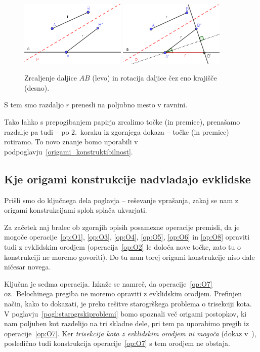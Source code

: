\begin{dokaz}
    \begin{figure}[h]
        \centering
        \includegraphics[width=0.45\textwidth]{images/zrcaljenje_korak1.png}
        \includegraphics[width=0.45\textwidth]{images/zrcaljenje_korak2.png}
        \caption[Prenašanje razdalj z origamijem po korakih]{Zrcaljenje daljice $AB$ (levo) in rotacija daljice čez eno krajišče (desno).}
        \label{fig:prenos_razdalje_koraki}
    \end{figure}

    S tem smo razdaljo $r$ prenesli na poljubno mesto v ravnini.
\end{dokaz}

Tako lahko s prepogibanjem papirja zrcalimo točke (in premice), prenašamo razdalje pa tudi -- po 2.\ koraku iz zgornjega dokaza -- točke (in premice) rotiramo. To novo znanje bomo uporabili v podpoglavju~\ref{origami_konstruktibilnost}.

\subsection{Kje origami konstrukcije nadvladajo evklidske}

Prišli smo do ključnega dela poglavja -- reševanje vprašanja, zakaj se nam z origami konstrukcijami sploh splača ukvarjati.

Za začetek naj bralec ob zgornjih opisih posamezne operacije premisli, da je mogoče operacije~\ref{op:O1}, \ref{op:O3}, \ref{op:O4}, \ref{op:O5}, \ref{op:O6} in \ref{op:O8} opraviti tudi z evklidskim orodjem (operacija~\ref{op:O2} le določa nove točke, zato tu o konstrukciji ne moremo govoriti). Do tu nam torej origami konstrukcije niso dale ničesar novega.

Ključna je sedma operacija. Izkaže se namreč, da operacije~\ref{op:O7} oz.\ Belochinega pregiba ne moremo opraviti z evklidskim orodjem. Prefinjen način, kako to dokazati, je preko rešitve starogrškega problema o trisekciji kota. V poglavju~\ref{pogl:starogrskiproblemi} bomo spoznali več origami postopkov, ki nam poljuben kot razdelijo na tri skladne dele, pri tem pa uporabimo pregib iz operacije~\ref{op:O7}. Ker \emph{trisekcija kota z evklidskim orodjem ni mogoča} (dokaz v~\cite[str.\ 77--78]{jerman1998}), posledično tudi konstrukcija operacije~\ref{op:O7} s tem orodjem ne obstaja.

